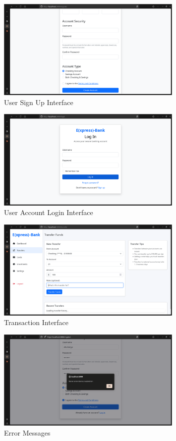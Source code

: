 \begin{figure}[h]
  \centering
  \includegraphics[width=0.8\textwidth]{register.png}
  \caption{User Sign Up Interface}
\end{figure}

\begin{figure}[h]
  \centering
  \includegraphics[width=0.8\textwidth]{login.png}
  \caption{User Account Login Interface}
\end{figure}

\begin{figure}[h]
  \centering
  \includegraphics[width=0.8\textwidth]{transfers.png}
  \caption{Transaction Interface}
\end{figure}

\begin{figure}[h]
  \centering
  \includegraphics[width=0.8\textwidth]{error.png}
  \caption{Error Messages}
\end{figure}

